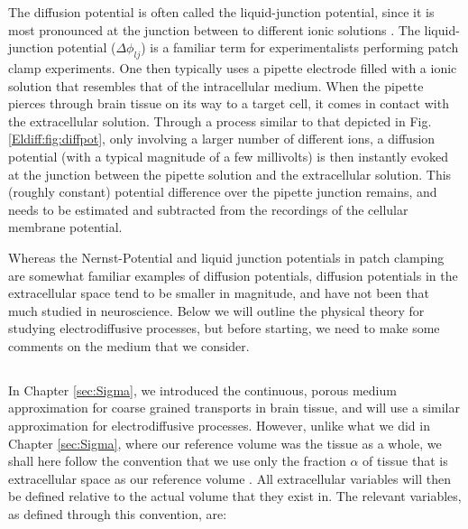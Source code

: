 The diffusion potential is often called the liquid-junction potential, since it is most pronounced at the junction between to different ionic solutions \citep{Sokalski2001}. The liquid-junction potential ($\Delta \phi_{lj}$) is a familiar term for experimentalists performing patch clamp experiments. One then typically uses a pipette electrode filled with a ionic solution that resembles that of the intracellular medium. When the pipette pierces through brain tissue on its way to a target cell, it comes in contact with the extracellular solution. Through a process similar to that depicted in Fig. \ref{Eldiff:fig:diffpot}, only involving a larger number of different ions, a diffusion potential (with a typical magnitude of a few millivolts) is then instantly evoked at the junction between the pipette solution and the extracellular solution. This (roughly constant) potential difference over the pipette junction remains, and needs to be estimated and subtracted from the recordings of the cellular membrane potential.

Whereas the Nernst-Potential and liquid junction potentials in patch clamping are somewhat familiar examples of diffusion potentials, diffusion potentials in the extracellular space tend to be smaller in magnitude, and have not been that much studied in neuroscience. Below we will outline the physical theory for studying electrodiffusive processes, but before starting, we need to make some comments on the medium that we consider. 


\subsection{}
\label{sec:Eldiff:porous}
In Chapter \ref{sec:Sigma}, we introduced the continuous, porous medium approximation for coarse grained transports in brain tissue, and will use a similar approximation for electrodiffusive processes. However, unlike what we did in Chapter \ref{sec:Sigma}, where our reference volume was the tissue as a whole, we shall here follow the convention that we use only the fraction $\alpha$ of tissue that is extracellular space as our reference volume \citep{Nicholson2001}. All extracellular variables will then be defined relative to the actual volume that they exist in. The relevant variables, as defined through this convention, are: 

